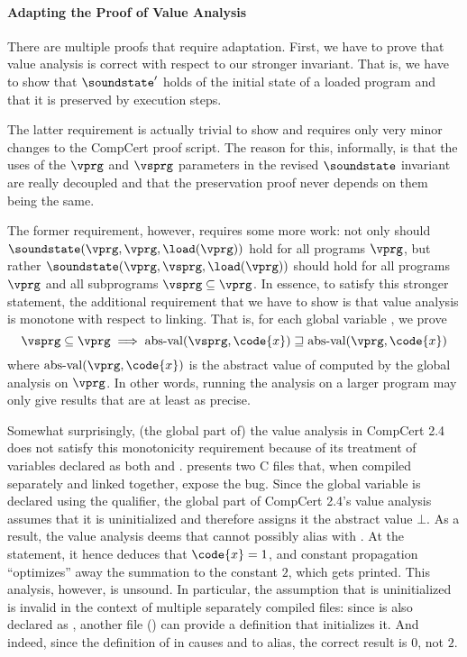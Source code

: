 
\paragraph{Adapting the Proof of Value Analysis}

There are multiple proofs that require adaptation.
First, we have to prove that value analysis is correct with respect to our stronger invariant.
That is, we have to show that $\soundstate'$ holds of the initial state of a loaded program and that it is preserved by execution steps.

The latter requirement is actually trivial to show and requires only
very minor changes to the CompCert proof script.  The reason for this,
informally, is that the uses of the $\vprg$ and $\vsprg$ parameters in
the revised $\soundstate$ invariant are really decoupled and that the
preservation proof never depends on them being the same.


The former requirement, however, requires some more work:
not only should $\soundstate(\vprg,\vprg,\load(\vprg))$ hold for all programs $\vprg$,
but rather $\soundstate(\vprg,\vsprg,\load(\vprg))$ should hold for all programs $\vprg$ and all subprograms $\vsprg\subseteq\vprg$.
In essence, to satisfy this stronger statement, the additional requirement that we have to show is that value analysis is monotone with respect to linking.
That is, for each global variable , we prove
\[
\vsprg \subseteq \vprg \implies  \mathrm{abs\text{-}val}(\vsprg,\code{x}) \sqsupseteq \mathrm{abs\text{-}val}(\vprg,\code{x})
\]
where $\mathrm{abs\text{-}val}(\vprg,\code{x})$ is the abstract value of  computed by the global analysis on $\vprg$.
In other words, running the analysis on a larger program may only give results that are at least as precise.

Somewhat surprisingly, (the global part of) the value analysis in
CompCert 2.4 does not satisfy this monotonicity requirement because of
its treatment of variables declared as both  and
.   presents two C files that,
when compiled separately and linked together, expose the bug.  Since
the global variable  is declared using the 
qualifier, the global part of CompCert 2.4's value analysis assumes
that it is uninitialized and therefore assigns it the abstract value
$\bot$.  As a result, the value analysis deems that  cannot
possibly alias with .  At the  statement, it
hence deduces that $\code{x}=1$, and constant propagation
``optimizes'' away the summation  to the constant $2$, which
gets printed.  This analysis, however, is unsound.  In particular, the
assumption that  is uninitialized is invalid in the context
of multiple separately compiled files: since  is also
declared as , another file () can provide a
definition that initializes it.  And indeed, since the definition of
 in  causes  and  to alias, the
correct result is $0$, not $2$.

